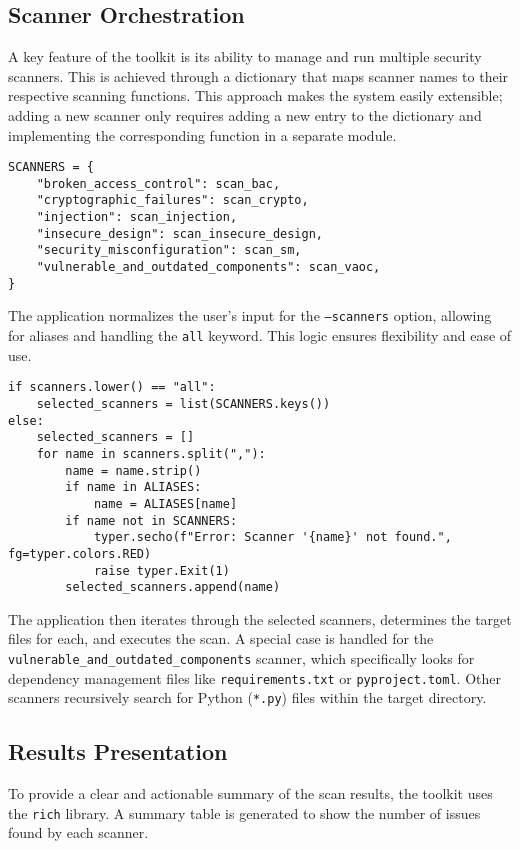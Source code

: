 \subsection{Scanner Orchestration}

A key feature of the toolkit is its ability to manage and run multiple security scanners. This is achieved through a dictionary that maps scanner names to their respective scanning functions. This approach makes the system easily extensible; adding a new scanner only requires adding a new entry to the dictionary and implementing the corresponding function in a separate module.

\begin{verbatim}
SCANNERS = {
    "broken_access_control": scan_bac,
    "cryptographic_failures": scan_crypto,
    "injection": scan_injection,
    "insecure_design": scan_insecure_design,
    "security_misconfiguration": scan_sm,
    "vulnerable_and_outdated_components": scan_vaoc,
}
\end{verbatim}

The application normalizes the user's input for the \texttt{--scanners} option, allowing for aliases and handling the \texttt{all} keyword. This logic ensures flexibility and ease of use.

\begin{verbatim}
if scanners.lower() == "all":
    selected_scanners = list(SCANNERS.keys())
else:
    selected_scanners = []
    for name in scanners.split(","):
        name = name.strip()
        if name in ALIASES:
            name = ALIASES[name]
        if name not in SCANNERS:
            typer.secho(f"Error: Scanner '{name}' not found.", fg=typer.colors.RED)
            raise typer.Exit(1)
        selected_scanners.append(name)
\end{verbatim}

The application then iterates through the selected scanners, determines the target files for each, and executes the scan. A special case is handled for the \texttt{vulnerable\_and\_outdated\_components} scanner, which specifically looks for dependency management files like \texttt{requirements.txt} or \texttt{pyproject.toml}. Other scanners recursively search for Python (\texttt{*.py}) files within the target directory.

\subsection{Results Presentation}

To provide a clear and actionable summary of the scan results, the toolkit uses the \texttt{rich} library. A summary table is generated to show the number of issues found by each scanner.

